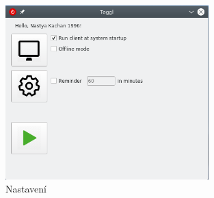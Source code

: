 \documentclass[thesis=B,czech]{FITthesis}[2012/06/26]
\begin{document}
\begin{figure}[h]\centering
	\includegraphics[width=0.7\textwidth]{toggl_set.png}
	\caption[Nastavení]{Nastavení}\label{fig:t_set}
\end{figure}
\end{document}
